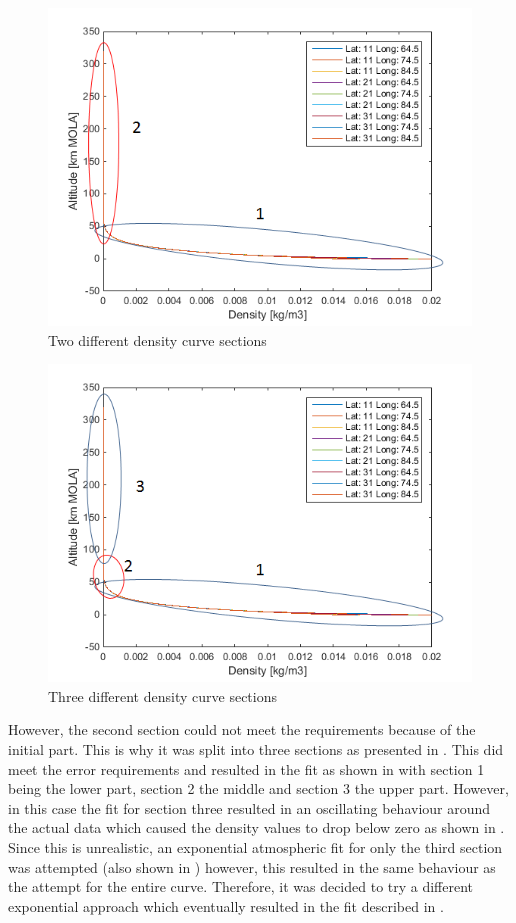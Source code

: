 \begin{figure}[H]
\centering
\includegraphics[width=0.69 \textwidth]{figures/software/densityDataSplit2.png}
\caption{Two different density curve sections}
\label{fig:densityDataSplit2}
\end{figure}



\begin{figure}[H]
\centering
\includegraphics[width=0.7 \textwidth]{figures/software/densityDataSplit3.png}
\caption{Three different density curve sections}
\label{fig:densityDataSplit3}
\end{figure}

\noindent
However, the second section could not meet the requirements because of the initial part. This is why it was split into three sections as presented in . This did meet the error requirements and resulted in the fit as shown in  with section 1 being the lower part, section 2 the middle and section 3 the upper part. However, in this case the fit for section three resulted in an oscillating behaviour around the actual data which caused the density values to drop below zero as shown in . Since this is unrealistic, an exponential atmospheric fit for only the third section was attempted (also shown in ) however, this resulted in the same behaviour as the attempt for the entire curve. Therefore, it was decided to try a different exponential approach which eventually resulted in the fit described in .

